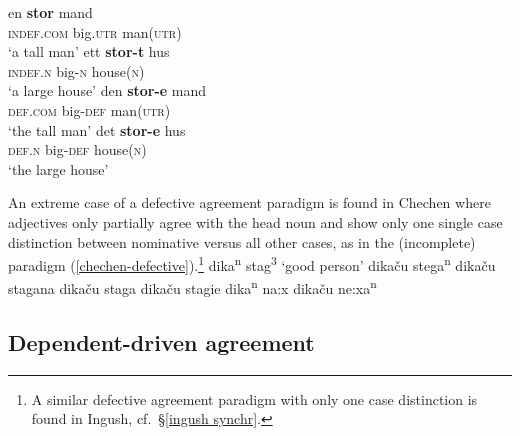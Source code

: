 \begin{exe}
\ex 
{} \label{danish agr ex}
\begin{xlist}
\ex
\gll en \textbf{stor} mand\\
	\textsc{indef.com} big.\textsc{utr} man(\textsc{utr})\\
\glt	‘a tall man’
\ex
\gll ett \textbf{stor-t} hus\\
	\textsc{indef.n} big-\textsc{n} house(\textsc{n})\\
\glt	‘a large house’
\ex	
\gll den \textbf{stor-e} mand\\
	\textsc{def.com} big-\textsc{def} man(\textsc{utr})\\
\glt	‘the tall man’
\ex
\gll det \textbf{stor-e} hus\\
	\textsc{def.n} big-\textsc{def} house(\textsc{n})\\
\glt	‘the large house’
\end{xlist}
\end{exe}
An extreme case of a defective agreement paradigm is found in Chechen where adjectives only partially agree with the head noun and show only one single case distinction between nominative versus all other cases, as in the (incomplete) paradigm (\ref{chechen-defective}).\footnote{A similar defective agreement paradigm with only one case distinction is found in Ingush, cf.~\S\ref{ingush synchr}.}
\ea \label{chechen-defective}
\ea dika\textsuperscript{n} stag\textsuperscript{3} {\rm ‘good person’}	
\ex dikaču stega\textsuperscript{n} 							
\ex dikaču stagana 										
\ex dikaču staga 										
\ex dikaču stagie										
\ex dika\textsuperscript{n} na:x								
\ex dikaču ne:xa\textsuperscript{n}							
\zl

\subsection{Dependent-driven agreement}

